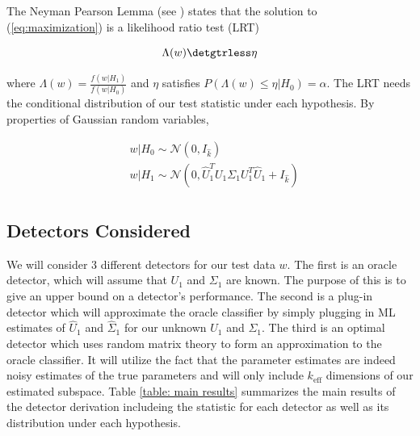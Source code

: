 The Neyman Pearson Lemma (see \cite{van1968detection}) states that the solution to (\ref{eq:maximization}) is a likelihood ratio test (LRT)

\begin{equation*}
\Lambda(w) \detgtrless \eta
\end{equation*}

where $\Lambda(w) = \frac{f(w|H_1)}{f(w|H_0)}$ and $\eta$ satisfies $P(\Lambda(w)\leq\eta|H_0)=\alpha$. The LRT needs the conditional distribution of our test statistic under each hypothesis. By properties of Gaussian random variables,

\begin{equation*}
\begin{aligned}
&w|H_0\sim\mathcal{N}(0,I_{\widehat{k}})\\
&w|H_1\sim\mathcal{N}(0, \widehat{U}_1^TU_1\Sigma_1U_1^T\widehat{U}_1 +I_{\widehat{k}})\\
\end{aligned}
\end{equation*}

\subsection{Detectors Considered}\label{sec:main results}

We will consider 3 different detectors for our test data $w$. The first is an oracle detector, which will assume that $U_1$ and $\Sigma_1$ are known. The purpose of this is to give an upper bound on a detector's performance. The second is a plug-in detector which will approximate the oracle classifier by simply plugging in ML estimates of $\widehat{U}_1$  and $\widehat{\Sigma}_1$ for our unknown $U_1$ and $\Sigma_1$. The third is an optimal detector which uses  random matrix theory to form an approximation to the oracle classifier. It will utilize the fact that the parameter estimates are indeed noisy estimates of the true parameters and will only include $k_\text{eff}$ dimensions of our estimated subspace. Table \ref{table: main results} summarizes the main results of the detector derivation includeing the statistic for each detector as well as its distribution under each hypothesis.

